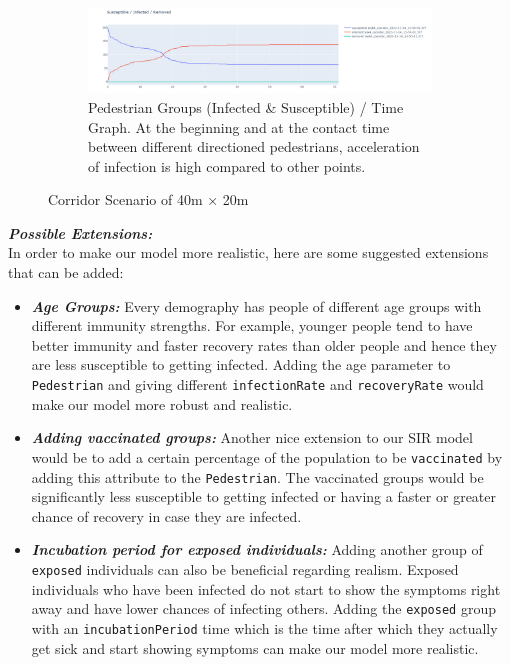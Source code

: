 \begin{figure}[H]
    \begin{subfigure}{\textwidth}
        \centering
        \includegraphics[width=\linewidth]{images/task4_cooridor1.png}
        \caption{Pedestrian Groups (Infected \& Susceptible) / Time Graph. At the beginning and at the contact time between different directioned pedestrians, acceleration of infection is high compared to other points.}
        \label{fig:task4_graph_cor}
    \end{subfigure}
    
    \caption{Corridor Scenario of 40m × 20m}
\end{figure}





 \textit{\textbf{Possible Extensions:}} \\
In order to make our model more realistic, here are some suggested extensions that can be added:\newline
\begin{itemize}
    \item \textit{\textbf{Age Groups: }}Every demography has people of different age groups with different immunity strengths. For example, younger people tend to have better immunity and faster recovery rates than older people and hence they are less susceptible to getting infected. Adding the age parameter to \texttt{Pedestrian} and giving different \texttt{infectionRate} and \texttt{recoveryRate} would make our model more robust and realistic. 
    \item \textit{\textbf{Adding vaccinated groups: }}Another nice extension to our SIR model would be to add a certain percentage of the population to be \texttt{vaccinated} by adding this attribute to the \texttt{Pedestrian}. The vaccinated groups would be significantly less susceptible to getting infected or having a faster or greater chance of recovery in case they are infected.
    \item \textit{\textbf{Incubation period for exposed individuals:} }Adding another group of \texttt{exposed} individuals can also be beneficial regarding realism. Exposed individuals who have been infected do not start to show the symptoms right away and have lower chances of infecting others. Adding the \texttt{exposed} group with an \texttt{incubationPeriod} time which is the time after which they actually get sick and start showing symptoms can make our model more realistic. 
\end{itemize}

 